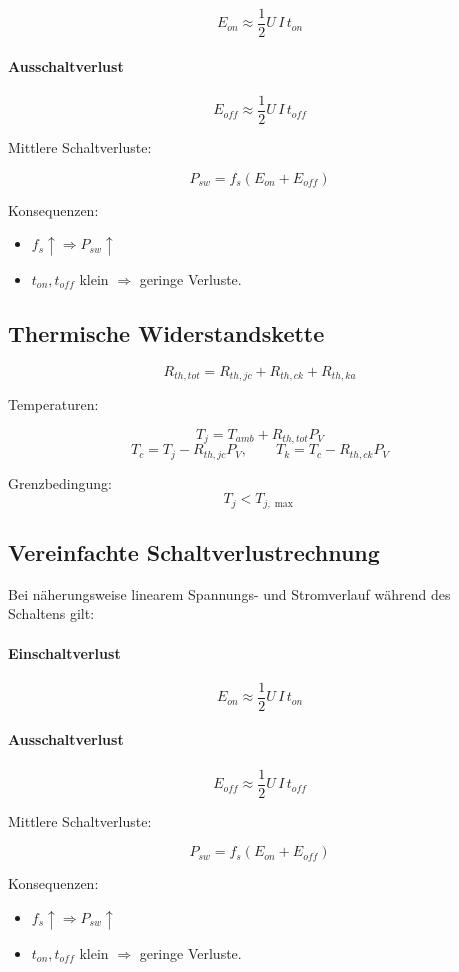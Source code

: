\[
\boxed{E_{on} \approx \frac{1}{2} U \, I \, t_{on}}
\]

\paragraph{Ausschaltverlust}

\[
\boxed{E_{off} \approx \frac{1}{2} U \, I \, t_{off}}
\]

Mittlere Schaltverluste:

\[
\boxed{
P_{sw} = f_s \left(E_{on} + E_{off}\right)
}
\]

Konsequenzen:
\begin{itemize}
\item $f_s \uparrow \Rightarrow P_{sw} \uparrow$
\item $t_{on}, t_{off}$ klein $\Rightarrow$ geringe Verluste.
\end{itemize}

\subsection{Thermische Widerstandskette}

\[
\boxed{R_{th,tot} = R_{th,jc} + R_{th,ck} + R_{th,ka}}
\]

Temperaturen:

\[
T_j = T_{amb} + R_{th,tot} P_V
\]
\[
T_c = T_j - R_{th,jc} P_V,
\qquad
T_k = T_c - R_{th,ck} P_V
\]

Grenzbedingung:
\[
\boxed{T_j < T_{j,\max}}
\]
\subsection{Vereinfachte Schaltverlustrechnung}

Bei näherungsweise linearem Spannungs- und Stromverlauf während des Schaltens gilt:

\paragraph{Einschaltverlust}

\[
\boxed{E_{on} \approx \frac{1}{2} U \, I \, t_{on}}
\]

\paragraph{Ausschaltverlust}

\[
\boxed{E_{off} \approx \frac{1}{2} U \, I \, t_{off}}
\]

Mittlere Schaltverluste:

\[
\boxed{
P_{sw} = f_s \left(E_{on} + E_{off}\right)
}
\]

Konsequenzen:
\begin{itemize}
\item $f_s \uparrow \Rightarrow P_{sw} \uparrow$
\item $t_{on}, t_{off}$ klein $\Rightarrow$ geringe Verluste.
\end{itemize}
